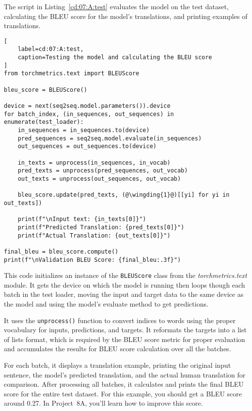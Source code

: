 The script in Listing~\ref{cd:07:A:test} evaluates the model on the test dataset, calculating the BLEU score for the model's translations, and printing examples of translations.
\begin{lstlisting}[
    label=cd:07:A:test,
    caption=Testing the model and calculating the BLEU score
]
from torchmetrics.text import BLEUScore

bleu_score = BLEUScore()

device = next(seq2seq.model.parameters()).device
for batch_index, (in_sequences, out_sequences) in enumerate(test_loader):
    in_sequences = in_sequences.to(device)
    pred_sequences = seq2seq.model.evaluate(in_sequences)
    out_sequences = out_sequences.to(device)

    in_texts = unprocess(in_sequences, in_vocab)
    pred_texts = unprocess(pred_sequences, out_vocab)
    out_texts = unprocess(out_sequences, out_vocab)
    
    bleu_score.update(pred_texts, (@\wingding{1}@)[[yi] for yi in out_texts])

    print(f"\nInput text: {in_texts[0]}")
    print(f"Predicted Translation: {pred_texts[0]}")
    print(f"Actual Translation: {out_texts[0]}")

final_bleu = bleu_score.compute()
print(f"\nValidation BLEU Score: {final_bleu:.3f}")
\end{lstlisting}
This code initializes an instance of the \lstinline{BLEUScore} class from the \emph{torchmetrics.text} module.
It gets the device on which the model is running then loops though each batch in the test loader, moving the input and target data to the same device as the model and using the model's evaluate method to get predictions. 

It uses the \lstinline{unprocess()} function to convert indices to words using the proper vocabulary for inputs, predictions, and targets. It reformats the targets into a list of lists format, which is required by the BLEU score metric for proper evaluation  and accumulates the results for BLEU score calculation over all the batches.

For each batch, it displays a translation example, printing the original input sentence, the model's predicted translation, and the actual human translation for comparison.
After processing all batches, it calculates and prints the final BLEU score for the entire test dataset. For this example, you should get a BLEU score around 0.27. In Project~8A, you'll learn how to improve this score.

